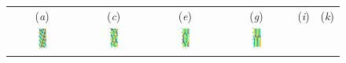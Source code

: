 \begin{figure}[t]
\begin{center}
\begin{tabular}{cccccc} (\textit{a}) & (\textit{c}) & (\textit{e}) &
                        (\textit{g}) & (\textit{i}) & (\textit{k})\\
\includegraphics[width=0.15\textwidth, clip=true]{figs_bmp/ks22rpo016.3-02.86.eps}\hspace{-3ex} &
\includegraphics[width=0.15\textwidth, clip=true]{figs_bmp/ks22rpo033.5-04.04.eps}\hspace{-3ex} &
\includegraphics[width=0.15\textwidth, clip=true]{figs_bmp/ks22rpo047.6-05.68.eps}\hspace{-3ex} &
\includegraphics[width=0.15\textwidth, clip=true]{figs_bmp/ks22rpo071.7-05.50.eps}\hspace{-3ex} &

\end{tabular}
\end{center}
\end{figure}
